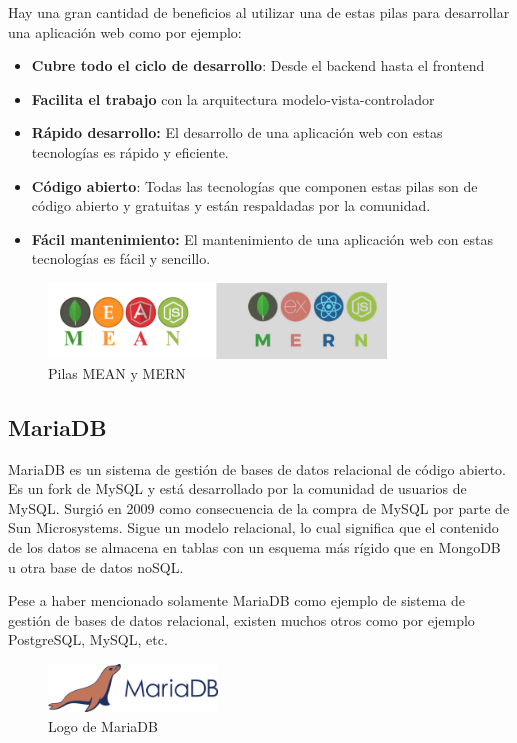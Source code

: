 Hay una gran cantidad de beneficios al utilizar una de estas pilas para desarrollar una aplicación web como por ejemplo:
\begin{itemize}
\item \textbf{Cubre todo el ciclo de desarrollo}: Desde el backend hasta el frontend
\item \textbf{Facilita el trabajo} con la arquitectura modelo-vista-controlador
\item \textbf{Rápido desarrollo:} El desarrollo de una aplicación web con estas tecnologías es rápido y eficiente.
\item \textbf{Código abierto}: Todas las tecnologías que componen estas pilas son de código abierto y gratuitas y están respaldadas por la comunidad.
\item \textbf{Fácil mantenimiento:} El mantenimiento de una aplicación web con estas tecnologías es fácil y sencillo.
\end{itemize}

\begin{figure}[H]
    \centering
    \includegraphics[width=0.8\textwidth]{imagenes/c2/MERN.png}
    \caption{Pilas MEAN y MERN}
\end{figure}

\subsection{MariaDB}
MariaDB es un sistema de gestión de bases de datos relacional de código abierto. Es un fork de MySQL y está desarrollado por la comunidad de usuarios de MySQL. Surgió en 2009 como
consecuencia de la compra de MySQL por parte de Sun Microsystems.
Sigue un modelo relacional, lo cual significa que el contenido de los datos se almacena en tablas con un esquema más rígido que en MongoDB u otra base de datos noSQL.

Pese a haber mencionado solamente MariaDB como ejemplo de sistema de gestión de bases de datos relacional, existen muchos otros como por ejemplo PostgreSQL, MySQL, etc.


\begin{figure}[H]
    \centering
    \includegraphics[width=0.4\textwidth]{imagenes/c2/mariadb.png}
    \caption{Logo de MariaDB}
\end{figure}
